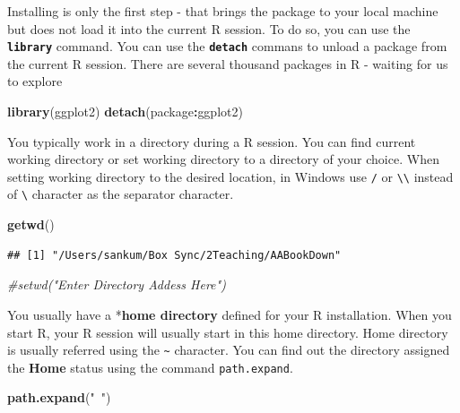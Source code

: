 \documentclass[]{krantz}
\makeatletter
\newenvironment{Shaded}{\begin{snugshade}}{\end{snugshade}}
\newcommand{\KeywordTok}[1]{\textcolor[rgb]{0.27,0.27,0.27}{\textbf{#1}}}
\newcommand{\StringTok}[1]{\textcolor[rgb]{0.5,0.5,0.5}{#1}}
\newcommand{\CommentTok}[1]{\textcolor[rgb]{0.56,0.35,0.01}{\textit{#1}}}
\newcommand{\OperatorTok}[1]{\textcolor[rgb]{0.81,0.36,0.00}{\textbf{#1}}}
\newcommand{\NormalTok}[1]{#1}
\newenvironment{kframe}{%
\medskip{}
\setlength{\fboxsep}{.8em}
 \def\at@end@of@kframe{}%
 \ifinner\ifhmode%
  \def\at@end@of@kframe{\end{minipage}}%
  \begin{minipage}{\columnwidth}%
 \fi\fi%
 \def\FrameCommand##1{\hskip\@totalleftmargin \hskip-\fboxsep
 \colorbox{shadecolor}{##1}\hskip-\fboxsep
     \hskip-\linewidth \hskip-\@totalleftmargin \hskip\columnwidth}%
 \MakeFramed {\advance\hsize-\width
   \@totalleftmargin\z@ \linewidth\hsize
   \@setminipage}}%
 {\par\unskip\endMakeFramed%
 \at@end@of@kframe}
\renewenvironment{Shaded}{\begin{kframe}}{\end{kframe}}
\theoremstyle{definition}
\theoremstyle{definition}
\theoremstyle{definition}
\theoremstyle{remark}
\makeatother
\begin{document}
Installing is only the first step - that brings the package to your
local machine but does not load it into the current R session. To do so,
you can use the \textbf{\texttt{library}} command. You can use the
\textbf{\texttt{detach}} commans to unload a package from the current R
session. There are several thousand packages in R - waiting for us to
explore

\begin{Shaded}
\begin{Highlighting}[]
\KeywordTok{library}\NormalTok{(ggplot2)}
\KeywordTok{detach}\NormalTok{(package}\OperatorTok{:}\NormalTok{ggplot2)}
\end{Highlighting}
\end{Shaded}

You typically work in a directory during a R session. You can find
current working directory or set working directory to a directory of
your choice. When setting working directory to the desired location, in
Windows use \texttt{/} or \texttt{\textbackslash{}\textbackslash{}}
instead of \texttt{\textbackslash{}} character as the separator
character.

\begin{Shaded}
\begin{Highlighting}[]
\KeywordTok{getwd}\NormalTok{()}
\end{Highlighting}
\end{Shaded}

\begin{verbatim}
## [1] "/Users/sankum/Box Sync/2Teaching/AABookDown"
\end{verbatim}

\begin{Shaded}
\begin{Highlighting}[]
\CommentTok{#setwd("Enter Directory Addess Here")}
\end{Highlighting}
\end{Shaded}

You usually have a *\textbf{home directory} defined for your R
installation. When you start R, your R session will usually start in
this home directory. Home directory is usually referred using the
\texttt{\textasciitilde{}} character. You can find out the directory
assigned the \textbf{Home} status using the command
\texttt{path.expand}.

\begin{Shaded}
\begin{Highlighting}[]
\KeywordTok{path.expand}\NormalTok{(}\StringTok{"~"}\NormalTok{)}
\end{Highlighting}
\end{Shaded}
\end{document}

